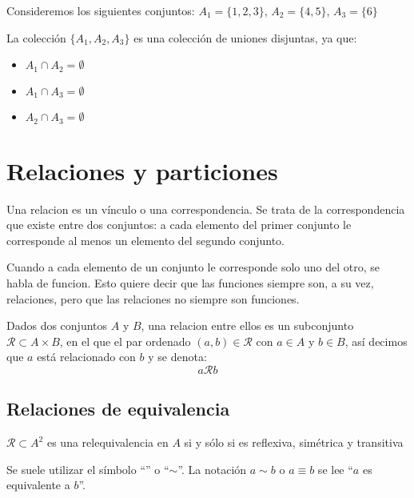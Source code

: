 \begin{fmd-example}
	Consideremos los siguientes conjuntos: \(A_1 = \{1, 2, 3\}\), \(A_2 = \{4, 5\}\), \(A_3 = \{6\}\)
	
	La colección \(\{A_1, A_2, A_3\}\) es una colección de uniones disjuntas, ya que:
	\begin{itemize}[itemsep=0pt]
		\item \(A_1 \cap A_2 = \emptyset\)
		\item \(A_1 \cap A_3 = \emptyset\)
		\item \(A_2 \cap A_3 = \emptyset\)
	\end{itemize}
\end{fmd-example}


\section{Relaciones y particiones}
	Una \gls{relacion} es un vínculo o una correspondencia. Se trata de la correspondencia que existe entre dos conjuntos: a cada elemento del primer conjunto le corresponde al menos un elemento del segundo conjunto.
	
	Cuando a cada elemento de un conjunto le corresponde solo uno del otro, se habla de \gls{funcion}. Esto quiere decir que las funciones siempre son, a su vez, relaciones, pero que las relaciones no siempre son funciones.

\begin{fmd-definition}[Relaciones] 
	Dados dos conjuntos $A$ y $B$, una \gls{relacion} entre ellos es un subconjunto $\mathcal{R} \subset A \times B$, en el que el par ordenado $(a, b) \in \mathcal{R}$ con $a \in A$ y $b \in B$, así decimos que $a$ está relacionado con $b$ y se denota:
	\[ a \mathcal{R} b \]
\end{fmd-definition}

\subsection{Relaciones de equivalencia}
\vspace{3mm} 
\begin{fmd-definition}
	$\mathcal{R} \subset A^2$ es una \gls{relequivalencia} en $A$ si y sólo si es reflexiva, simétrica y transitiva
\end{fmd-definition}

Se suele utilizar el símbolo ``'' o ``$\sim$''. La notación $a \sim b$ o $a \equiv b$ se lee ``$a$ es equivalente a $b$''.

